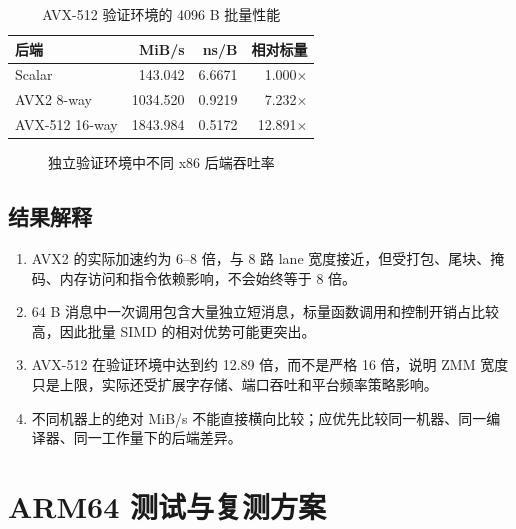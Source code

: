 \documentclass[UTF8,a4paper,12pt]{ctexart}
\begin{document}
\begin{table}[H]
\centering
\caption{AVX-512 验证环境的 4096 B 批量性能}
\begin{tabular}{lrrr}
\toprule
后端 & MiB/s & ns/B & 相对标量 \\
\midrule
Scalar & 143.042 & 6.6671 & 1.000$\times$ \\
AVX2 8-way & 1034.520 & 0.9219 & 7.232$\times$ \\
AVX-512 16-way & 1843.984 & 0.5172 & 12.891$\times$ \\
\bottomrule
\end{tabular}
\end{table}

\begin{figure}[H]
\centering
{}
\caption{独立验证环境中不同 x86 后端吞吐率}
\end{figure}

\subsection{结果解释}
\begin{enumerate}
  \item AVX2 的实际加速约为 6--8 倍，与 8 路 lane 宽度接近，但受打包、尾块、掩码、内存访问和指令依赖影响，不会始终等于 8 倍。
  \item 64 B 消息中一次调用包含大量独立短消息，标量函数调用和控制开销占比较高，因此批量 SIMD 的相对优势可能更突出。
  \item AVX-512 在验证环境中达到约 12.89 倍，而不是严格 16 倍，说明 ZMM 宽度只是上限，实际还受扩展字存储、端口吞吐和平台频率策略影响。
  \item 不同机器上的绝对 MiB/s 不能直接横向比较；应优先比较同一机器、同一编译器、同一工作量下的后端差异。
\end{enumerate}

\section{ARM64 测试与复测方案}
\end{document}
